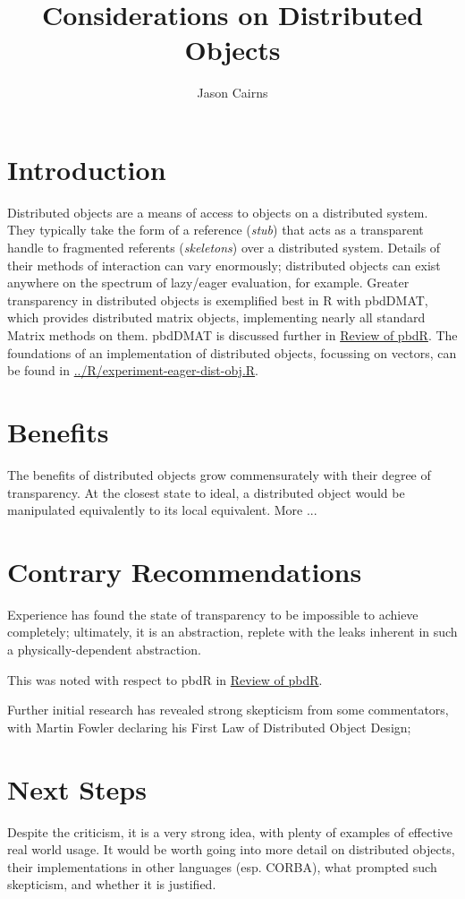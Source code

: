 \documentclass[a4paper,10pt]{article}
\begin{document}
\title{Considerations on Distributed Objects}
\author{Jason Cairns}
  
\maketitle

\section{Introduction}

Distributed objects are a means of access to objects on a distributed system.
They typically take the form of a reference (\textit{stub}) that acts as a transparent
handle to fragmented referents (\textit{skeletons}) over a distributed system.
Details of their methods of interaction can vary enormously; distributed
objects can exist anywhere on the spectrum of lazy/eager evaluation, for
example.
Greater transparency in distributed objects is exemplified best in R with
pbdDMAT, which provides distributed matrix objects, implementing nearly all
standard Matrix methods on them. 
pbdDMAT is discussed further in \href{review-pbdr.pdf}{Review of pbdR}.
The foundations of an implementation of distributed objects, focussing on
vectors, can be found in
\href{R/experiment-eager-dist-obj.R}{../R/experiment-eager-dist-obj.R}.

\section{Benefits}

The benefits of distributed objects grow commensurately with their degree of
transparency.
At the closest state to ideal, a distributed object would be manipulated
equivalently to its local equivalent.
More ...

\section{Contrary Recommendations}
Experience has found the state of transparency to be impossible to achieve
completely; ultimately, it is an abstraction, replete with the leaks inherent
in such a physically-dependent abstraction.

This was noted with respect to pbdR in \href{review-pbdr.pdf}{Review of pbdR}.

Further initial research has revealed strong skepticism from some
commentators\cite{waldo1996note}\cite{rotem2006fallacies},
with Martin Fowler declaring his First Law of Distributed Object Design;


\section{Next Steps}

Despite the criticism, it is a very strong idea, with plenty of examples of
effective real world usage.  
It would be worth going into more detail on distributed objects, their
implementations in other languages (esp. CORBA), what prompted such skepticism,
and whether it is justified.

\printbibliography{}
\end{document}
